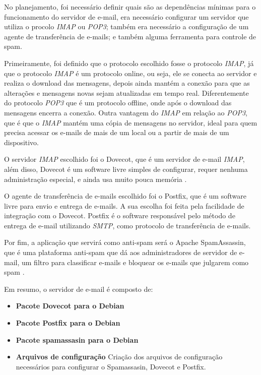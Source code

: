 No planejamento, foi necessário definir
quais são as dependências mínimas para o funcionamento do servidor de e-mail, era 
necessário configurar um servidor que utiliza o procolo \textit{IMAP} ou \textit{POP3};
também era necessário a configuração de um agente de transferência de e-mails; e também
alguma ferramenta para controle de spam.

Primeiramente, foi definido que o protocolo escolhido fosse o protocolo \textit{IMAP}, já
que o protocolo \textit{IMAP} é um protocolo online, ou seja, ele se conecta ao servidor
e realiza o download das mensagens, depois ainda  mantém a conexão para que
as alterações e mensagens novas sejam atualizadas em tempo real. Diferentemente do
protocolo \textit{POP3} que é um protocolo offline, onde após o download das mensagens encerra
a conexão. Outra vantagem do \textit{IMAP} em relação ao \textit{POP3}, que é que o 
\textit{IMAP} mantém uma cópia de mensagens no servidor, ideal para quem precisa 
acessar os e-mails de mais de um local ou a partir de mais de um dispositivo.

O servidor \textit{IMAP} escolhido foi o Dovecot, que é um servidor de e-mail
\textit{IMAP}, além disso, Dovecot é um software livre simples de configurar, requer nenhuma
administração especial, e ainda usa muito pouca memória \cite{dovecot}. 

O agente de transferência de e-mails escolhido foi o Postfix, que é um software
livre para envio e entrega de e-mails. A sua escolha foi feita pela facilidade de
integração com o Dovecot. Postfix é o software responsável pelo método de entrega de e-mail
utilizando \textit{SMTP}, como protocolo de transferência de e-mails. 

Por fim, a aplicação que servirá como anti-spam será o Apache SpamAssassin, que 
é uma plataforma anti-spam que dá aos administradores de servidor de e-mail, 
um filtro para classificar e-mails e bloquear os e-mails que julgarem como spam \cite{spam}. 

Em resumo, o servidor de e-mail é composto de:

\begin{itemize}
   \item \textbf{Pacote Dovecot para o Debian}
   \item \textbf{Pacote Postfix para o Debian}
   \item \textbf{Pacote spamassasin para o Debian}
   \item \textbf{Arquivos de configuração} Criação dos arquivos de configuração
   necessários para configurar o Spamassasin, Dovecot e Postfix.
\end{itemize}

